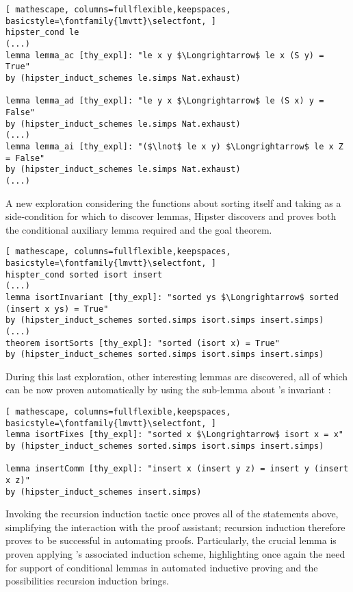 \begin{lstlisting}[ mathescape, columns=fullflexible,keepspaces, basicstyle=\fontfamily{lmvtt}\selectfont, ]
hipster_cond le
(...)
lemma lemma_ac [thy_expl]: "le x y $\Longrightarrow$ le x (S y) = True"
by (hipster_induct_schemes le.simps Nat.exhaust)

lemma lemma_ad [thy_expl]: "le y x $\Longrightarrow$ le (S x) y = False"
by (hipster_induct_schemes le.simps Nat.exhaust)
(...)
lemma lemma_ai [thy_expl]: "($\lnot$ le x y) $\Longrightarrow$ le x Z = False"
by (hipster_induct_schemes le.simps Nat.exhaust)
(...)
\end{lstlisting}

A new exploration considering the functions about sorting itself and taking  as a side-condition for which to discover lemmas, Hipster discovers and proves both the conditional auxiliary lemma required and the goal theorem.

\begin{lstlisting}[ mathescape, columns=fullflexible,keepspaces, basicstyle=\fontfamily{lmvtt}\selectfont, ]
hispter_cond sorted isort insert
(...)
lemma isortInvariant [thy_expl]: "sorted ys $\Longrightarrow$ sorted (insert x ys) = True"
by (hipster_induct_schemes sorted.simps isort.simps insert.simps)
(...)
theorem isortSorts [thy_expl]: "sorted (isort x) = True"
by (hipster_induct_schemes sorted.simps isort.simps insert.simps)
\end{lstlisting}

During this last exploration, other interesting lemmas are discovered, all of which can be now proven automatically by using the sub-lemma about 's invariant :

\begin{lstlisting}[ mathescape, columns=fullflexible,keepspaces, basicstyle=\fontfamily{lmvtt}\selectfont, ]
lemma isortFixes [thy_expl]: "sorted x $\Longrightarrow$ isort x = x"
by (hipster_induct_schemes sorted.simps isort.simps insert.simps)

lemma insertComm [thy_expl]: "insert x (insert y z) = insert y (insert x z)"
by (hipster_induct_schemes insert.simps)
\end{lstlisting}

Invoking the recursion induction tactic  once proves all of the statements above, simplifying the interaction with the proof assistant; recursion induction therefore proves to be successful in automating proofs.
%
Particularly, the crucial lemma  is proven applying 's associated induction scheme, highlighting once again the need for support of conditional lemmas in automated inductive proving and the possibilities recursion induction brings.


